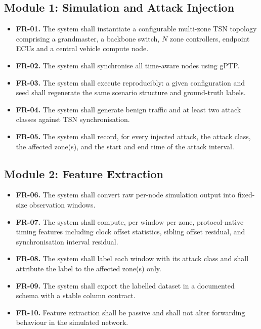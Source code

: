 \subsection{Module 1: Simulation and Attack Injection}
\begin{itemize}
\item \textbf{FR-01.} The system shall instantiate a configurable multi-zone TSN
topology comprising a grandmaster, a backbone switch, $N$ zone controllers, endpoint
ECUs and a central vehicle compute node.
\item \textbf{FR-02.} The system shall synchronise all time-aware nodes using gPTP.
\item \textbf{FR-03.} The system shall execute reproducibly: a given configuration and
seed shall regenerate the same scenario structure and ground-truth labels.
\item \textbf{FR-04.} The system shall generate benign traffic and at least two
attack classes against TSN synchronisation.
\item \textbf{FR-05.} The system shall record, for every injected attack, the attack
class, the affected zone(s), and the start and end time of the attack interval.
\end{itemize}

\subsection{Module 2: Feature Extraction}
\begin{itemize}
\item \textbf{FR-06.} The system shall convert raw per-node simulation output into
fixed-size observation windows.
\item \textbf{FR-07.} The system shall compute, per window per zone, protocol-native
timing features including clock offset statistics, sibling offset residual, and
synchronisation interval residual.
\item \textbf{FR-08.} The system shall label each window with its attack class and
shall attribute the label to the affected zone(s) only.
\item \textbf{FR-09.} The system shall export the labelled dataset in a documented
schema with a stable column contract.
\item \textbf{FR-10.} Feature extraction shall be passive and shall not alter
forwarding behaviour in the simulated network.
\end{itemize}

